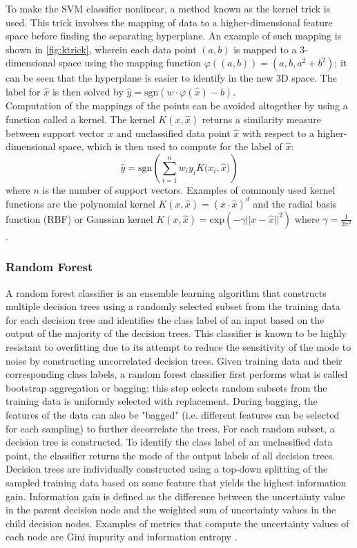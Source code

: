 \documentclass[conference,compsoc]{IEEEtran}
\begin{document}
To make the SVM classifier nonlinear, a method known as the kernel trick \cite{boser92} is used. This trick involves the mapping of data to a higher-dimensional feature space before finding the separating hyperplane. An example of such mapping is shown in \hyperref[fig:ktrick]{\autoref{fig:ktrick}}, wherein each data point $(a,b)$ is mapped to a 3-dimensional space using the mapping function $\varphi((a,b)) = (a,b,a^2 + b^2)$; it can be seen that the hyperplane is easier to identify in the new 3D space. The label for $\hat{x}$ is then solved by $\hat{y}= \text{sgn}(w \cdot \varphi(\hat{x}) - b)$.\\
\indent Computation of the mappings of the points can be avoided altogether by using a function called a kernel. The kernel $K(x,\hat{x})$ returns a similarity measure between support vector $x$ and unclassified data point $\hat{x}$ with respect to a higher-dimensional space, which is then used to compute for the label of $\hat{x}$:
\[ \hat{y}= \text{sgn}\left(\sum_{i=1}^{n}{w_iy_iK(x_i,\hat{x}})\right) \]
where $n$ is the number of support vectors. Examples of commonly used kernel functions are the polynomial kernel $K(x,\hat{x}) = (x \cdot \hat{x})^d$ and the radial basis function (RBF) or Gaussian kernel $K(x,\hat{x}) = \text{exp}(-\gamma \lvert\lvert x - \hat{x} \rvert\rvert^2) $\cite{chang10} where $\gamma = \frac{1}{2\sigma^2}$.

\subsubsection{Random Forest}
A random forest classifier \cite{breiman01} is an ensemble learning algorithm that constructs multiple decision trees using a randomly selected subset from the training data for each decision tree and identifies the class label of an input based on the output of the majority of the decision trees. This classifier is known to be highly resistant to overfitting due to its attempt to reduce the sensitivity of the mode to noise by constructing uncorrelated decision trees. Given training data and their corresponding class labels, a random forest classifier first performs what is called bootstrap aggregation or bagging; this step selects random subsets from the training data is uniformly selected with replacement. During bagging, the features of the data can also be "bagged" (i.e. different features can be selected for each sampling) to further decorrelate the trees.  For each random subset, a decision tree is constructed. To identify the class label of an unclassified data point, the classifier returns the mode of the output labels of all decision trees.\\
\indent Decision trees are individually constructed using a top-down splitting of the sampled training data based on some feature that yields the highest information gain. Information gain is defined as the difference between the uncertainty value in the parent decision node and the weighted sum of uncertainty values in the child decision nodes. Examples of metrics that compute the uncertainty values of each node are Gini impurity and information entropy \cite{breiman17}.
\end{document}
